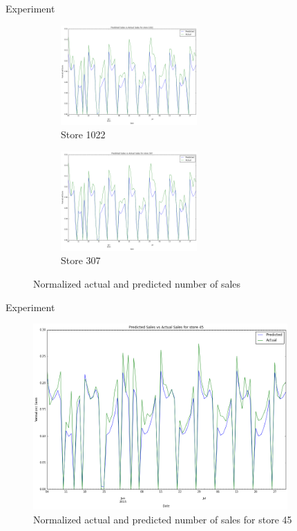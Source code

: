 \documentclass[10pt]{beamer}
\begin{document}
\begin{frame}{Experiment}
    \begin{figure}[t!]
        \centering
        \begin{subfigure}[t]{0.5\textwidth}
            \centering
            \includegraphics[height=1.5in]{rossmann_prediction_errors_store1022}
            \caption{Store 1022}
        \end{subfigure}%
        \begin{subfigure}[t]{0.5\textwidth}
            \centering
            \includegraphics[height=1.5in]{rossmann_prediction_errors_store307}
            \caption{Store 307}
        \end{subfigure}
        \label{fig:sub1}
        \caption{Normalized actual and predicted number of sales}
    \end{figure}
\end{frame}

\begin{frame}{Experiment}
    \begin{figure}[t!]
        \centering
        \includegraphics[height=2.8in]{rossmann_prediction_errors_store45}
        \caption{Normalized actual and predicted number of sales for store 45}
    \end{figure}
\end{frame}

\end{document}
